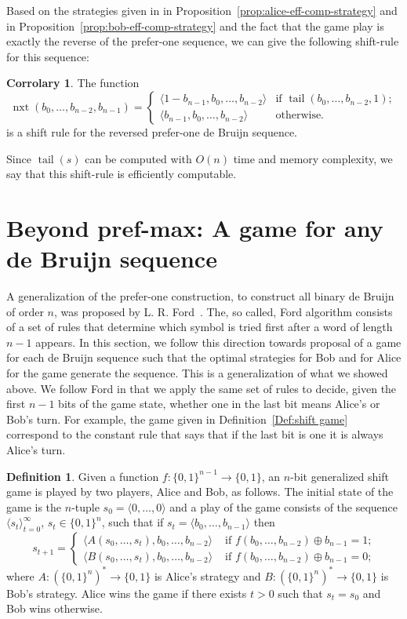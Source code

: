 \documentclass[final,12pt]{elsarticle}
\theoremstyle{definition} \newtheorem{definition}[theorem]{Definition} \newtheorem{observation}[theorem]{Observation} \newtheorem{example}[theorem]{Example} \newtheorem{remark}[theorem]{Remark} \newtheorem{corrolary}[theorem]{Corrolary}
\newcommand{\T}[1]{\langle{#1}\rangle}
\DeclareMathOperator{\tail}{tail}
\DeclareMathOperator{\nxt}{nxt}
\begin{document}
Based on the strategies given in  in Proposition~\ref{prop:alice-eff-comp-strategy} and in Proposition~\ref{prop:bob-eff-comp-strategy} and the fact that the game play is exactly the reverse of the prefer-one sequence, we can give the following shift-rule for this sequence:

\begin{corrolary}
The function
$$\nxt(b_0,\dots,b_{n-2},b_{n-1})=\begin{cases}
	\T{1-b_{n-1},b_0,\dots,b_{n-2}} & \text{if } \tail(b_0,\dots,b_{n-2},1); \\
	\T{b_{n-1},b_0,\dots,b_{n-2}} & \text{otherwise.}
\end{cases}$$
is a shift rule for the reversed prefer-one de Bruijn sequence.
\end{corrolary}


Since $\tail(s)$ can be computed with $O(n)$ time and memory complexity, we say that this shift-rule is efficiently computable.

\section{Beyond pref-max: A game for any de Bruijn sequence} 
\label{sec:games-for-all-DB-seq}

A generalization of the prefer-one construction, to construct all binary de Bruijn of order $n$, was proposed by L. R. Ford~\cite{ford1957cyclic}. The, so called, Ford algorithm consists of a set of rules that determine which symbol is tried first after a word of length $n-1$ appears. In this section, we follow this direction towards proposal of a game for each de Bruijn sequence such that the optimal strategies for Bob and for Alice for the game generate the sequence. This is a generalization of what we showed above. We follow Ford in that we apply the same set of rules to decide, given the first $n-1$ bits of the game state, whether one in the last bit means Alice's or Bob's turn. For example, the game given in Definition~\ref{Def:shift game} correspond to the constant rule that says that if the last bit is one it is always Alice's turn.

\begin{definition}
	\label{Def:generalized-shift game} Given a function $f\colon \{0,1\}^{n-1} \to \{0,1\}$, an $n$-bit generalized shift game is played by two players, Alice and Bob, as follows. The initial state of the game is the $n$-tuple $s_0=
		\T{0,\dots,0}$ and a play of the game consists of the sequence $
		\T{s_t }_{t=0}^\infty$, $s_t \in \{0,1\}^n$, such that if $s_t=
		\T{b_0, \dots, b_{n-1}}$ then $$s_{t+1} =
		\begin{cases}
			\T{ A(s_0,\dots,s_t), b_0, \dots, b_{n-2}} & \text{ if $f(b_0,\dots,b_{n-2}) \oplus b_{n-1} = 1$;} \\
			\T{ B(s_0,\dots,s_t), b_0, \dots, b_{n-2}} & \text{ if $f(b_0,\dots,b_{n-2}) \oplus b_{n-1} = 0$;}
		\end{cases}
	$$ where $A\colon(\{0,1\}^n)^* \to \{0,1\}$ is Alice's strategy and $B\colon (\{0,1\}^n)^* \to \{0,1\}$ is Bob's strategy. Alice wins the game if there exists $t>0$ such that $s_t=s_0$ and Bob wins otherwise.
\end{definition}
\end{document}
